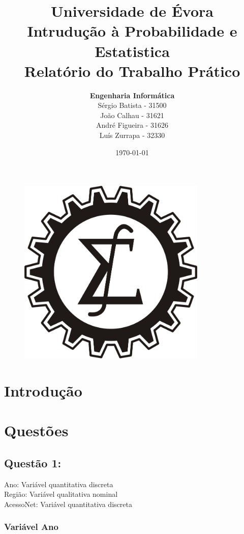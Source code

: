 \documentclass[a4paper,11pt]{article}
\date{\today}
\author{{\bf Engenharia Informática}\\Sérgio Batista - 31500\\João Calhau - 31621\\André Figueira - 31626\\Luís Zurrapa - 32330}
\title{{\bf Universidade de Évora}\\Intrudução à Probabilidade e Estatistica\\Relatório do Trabalho Prático}
\begin{document}
 
\maketitle

\begin{figure}[ht!]
\centering
\includegraphics[width=90mm]{estatistica}
\label{overflow}
\end{figure}

\newpage
\tableofcontents

\newpage
\section{Introdução}

\newpage
\section{Questões}
\subsection{Questão 1:}
\indent Ano: Variável quantitativa discreta\\
\indent Região: Variável qualitativa nominal\\
\indent AcessoNet: Variável quantitativa discreta

\subsubsection{Variável Ano}

\end{document}
